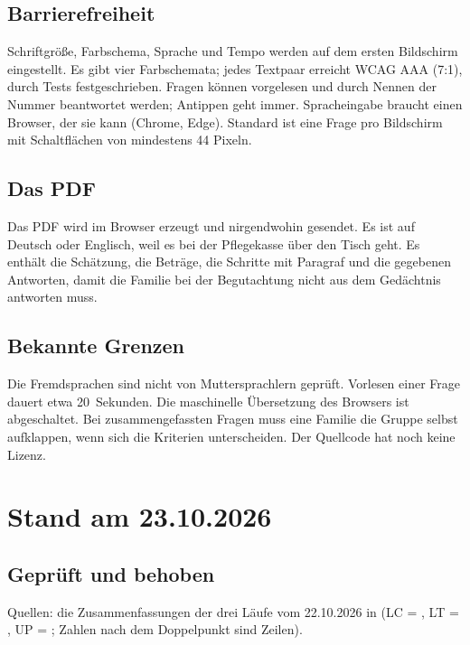\documentclass[10pt,parskip=half-]{scrartcl}
\begin{document}
\subsection{Barrierefreiheit}
Schriftgröße, Farbschema, Sprache und Tempo werden auf dem ersten Bildschirm eingestellt. Es
gibt vier Farbschemata; jedes Textpaar erreicht WCAG AAA (7:1), durch Tests festgeschrieben.
Fragen können vorgelesen und durch Nennen der Nummer beantwortet werden; Antippen geht immer.
Spracheingabe braucht einen Browser, der sie kann (Chrome, Edge). Standard ist eine Frage pro
Bildschirm mit Schaltflächen von mindestens 44 Pixeln.

\subsection{Das PDF}
Das PDF wird im Browser erzeugt und nirgendwohin gesendet. Es ist auf Deutsch oder Englisch,
weil es bei der Pflegekasse über den Tisch geht. Es enthält die Schätzung, die Beträge, die
Schritte mit Paragraf und die gegebenen Antworten, damit die Familie bei der Begutachtung nicht
aus dem Gedächtnis antworten muss.

\subsection{Bekannte Grenzen}
Die Fremdsprachen sind nicht von Muttersprachlern geprüft. Vorlesen einer Frage dauert etwa
20~Sekunden. Die maschinelle Übersetzung des Browsers ist abgeschaltet. Bei zusammengefassten
Fragen muss eine Familie die Gruppe selbst aufklappen, wenn sich die Kriterien unterscheiden.
Der Quellcode hat noch keine Lizenz.

\section{Stand am 23.10.2026}

\subsection{Geprüft und behoben}
Quellen: die Zusammenfassungen der drei Läufe vom 22.10.2026 in
 (LC = , LT =
, UP = ; Zahlen nach
dem Doppelpunkt sind Zeilen).
\end{document}
